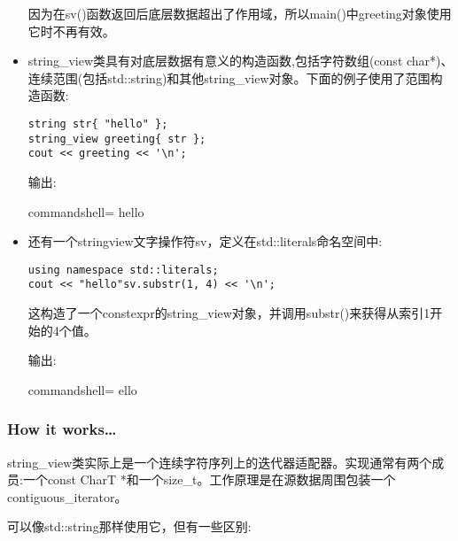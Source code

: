 \begin{itemize}
因为在sv()函数返回后底层数据超出了作用域，所以main()中greeting对象使用它时不再有效。

\item 
string\_view类具有对底层数据有意义的构造函数,包括字符数组(const char*)、连续范围(包括std::string)和其他string\_view对象。下面的例子使用了范围构造函数:

\begin{lstlisting}[style=styleCXX]
string str{ "hello" };
string_view greeting{ str };
cout << greeting << '\n';
\end{lstlisting}

输出:

\begin{tcblisting}{commandshell={}}
hello
\end{tcblisting}

\item 
还有一个stringview文字操作符sv，定义在std::literals命名空间中:

\begin{lstlisting}[style=styleCXX]
using namespace std::literals;
cout << "hello"sv.substr(1, 4) << '\n';
\end{lstlisting}

这构造了一个constexpr的string\_view对象，并调用substr()来获得从索引1开始的4个值。

输出:

\begin{tcblisting}{commandshell={}}
ello
\end{tcblisting}
\end{itemize}

\subsubsection{How it works…}

string\_view类实际上是一个连续字符序列上的迭代器适配器。实现通常有两个成员:一个const CharT *和一个size\_t。工作原理是在源数据周围包装一个contiguous\_iterator。

可以像std::string那样使用它，但有一些区别:

